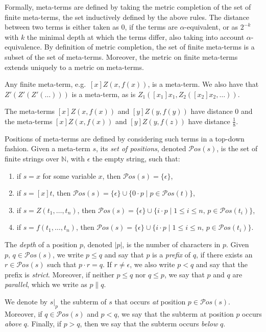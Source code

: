 \documentclass{LMCS}
\theoremstyle{plain}
\theoremstyle{definition}
\newcommand{\pos}[1]{\mathcal{P}os(#1)}
\newcommand{\natnum}{\mathbb{N}}
\newcommand{\seper}{\; | \;}
\begin{document}
Formally, meta-terms are defined by taking the metric completion of the set of finite meta-terms, the set inductively defined by the above rules. The distance between two terms is either taken as $0$, if the terms are $\alpha$-equivalent, or as $2^{-k}$ with $k$ the minimal depth at which the terms differ, also taking into account $\alpha$-equivalence. By definition of metric completion, the set of finite meta-terms is a subset of the set of meta-terms. Moreover, the metric on finite meta-terms extends uniquely to a metric on meta-terms.

\begin{exa}
Any finite meta-term, e.g.\ $[x]Z(x,f(x))$, is a meta-term. We also have that $Z'(Z'(Z'(\ldots)))$ is a meta-term, as is $Z_1([x_1]x_1,Z_2([x_2]x_2,\ldots))$.

The meta-terms $[x]Z(x,f(x))$ and $[y]Z(y,f(y))$ have distance $0$ and the meta-terms $[x]Z(x,f(x))$ and $[y]Z(y,f(z))$ have distance $\frac{1}{8}$.
\end{exa}

Positions of meta-terms are defined by considering such terms in a top-down fashion. Given a meta-term $s$, its \emph{set of positions}, denoted $\pos{s}$, is the set of finite strings over $\natnum$, with $\epsilon$ the empty string, such that:
\begin{enumerate}[(1)]
\item
if $s = x$ for some variable $x$, then $\pos{s} = \{ \epsilon \}$,
\item
if $s = [x] t$, then $\pos{s} = \{ \epsilon \} \cup \{ 0 \cdot p \seper p \in \pos{t} \}$,
\item
if $s = Z(t_1, \ldots, t_n)$, then $\pos{s} = \{ \epsilon \} \cup \{ i \cdot p \seper 1 \leq i \leq n, \, p \in \pos{t_i} \}$,
\item
if $s = f(t_1, \ldots, t_n)$, then $\pos{s} = \{ \epsilon \} \cup \{ i \cdot p \seper 1 \leq i \leq n, \, p \in \pos{t_i} \}$.
\end{enumerate}

The \emph{depth} of a position $p$, denoted $\vert p \vert$, is the
number of characters in $p$. Given $p, \, q \in \pos{s}$, we write $p \leq q$
and say that $p$ is a \emph{prefix} of $q$, if there exists an $r \in \pos{s}$ such that $p \cdot r = q$. If
$r \not = \epsilon$, we also write $p < q$ and say that the prefix is
\emph{strict}. Moreover, if neither $p \leq q$ nor $q \leq p$, we say that $p$
and $q$ are \emph{parallel}, which we write as $p \parallel q$. 

We denote by $s|_p$ the subterm of $s$ that occurs \emph{at} position $p \in \pos{s}$. Moreover, if $q \in \pos{s}$ and $p < q$, we say that the subterm at position $p$ occurs \emph{above} $q$. Finally, if $p > q$, then we say that the subterm occurs \emph{below} $q$.
\end{document}
